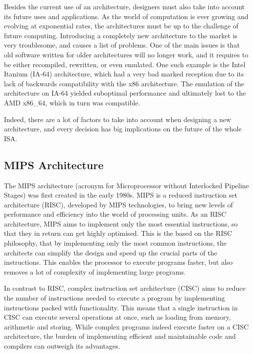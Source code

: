 Besides the current use of an architecture, designers must also take into
account its future uses and applications. As the world of computation is ever
growing and evolving at exponential rates, the architectures must be up to the
challenge of future computing. Introducing a completely new architecture to
the market is very troublesome, and causes a list of problems.
One of the main issues is that old software written for older architectures
will no longer work, and it requires to be either recompiled, rewritten,
or even emulated. One such example is the Intel Itanium (IA-64) architecture,
which had a very bad marked reception due to its lack of backwards compatibility
with the x86 architecture. The emulation of the architecture on IA-64 yielded
suboptimal performance and ultimately lost to the AMD x86\_64, which in turn was
compatible.\cite{anandtech:1854}

Indeed, there are a lot of factors to take into account when designing a new
architecture, and every decision has big implications on the future of the
whole ISA.

\subsection{MIPS Architecture}
The MIPS architecture (acronym for Microprocessor without Interlocked Pipeline
Stages) was first created in the early 1980s.\cite{imgtec:MIPS_Overview}
MIPS is a reduced instruction set architecture (RISC), developed by MIPS technologies, to bring new levels of
performance and efficiency into the world of processing units. As an RISC
architecture, MIPS aims to implement only the most essential instructions, so
that they in return can get highly optimised. This is the based on the RISC
philosophy, that by implementing only the most common instructions, the
architects can simplify the design and speed up the crucial parts of the
instructions. This enables the processor to execute programs faster, but also
removes a lot of complexity of implementing large programs.

In contrast to RISC, complex instruction set architecture (CISC) aims
to reduce the number of instructions needed to execute a program by
implementing instructions packed with functionality. This means that a single
instruction in CISC can execute several operations at once, such as loading from memory, arithmetic
and storing. While complex programs indeed execute faster on a CISC architecture,
the burden of implementing efficient and maintainable code and compilers can
outweigh its advantages. \cite{Patterson:1980:CRI:641914.641917}

